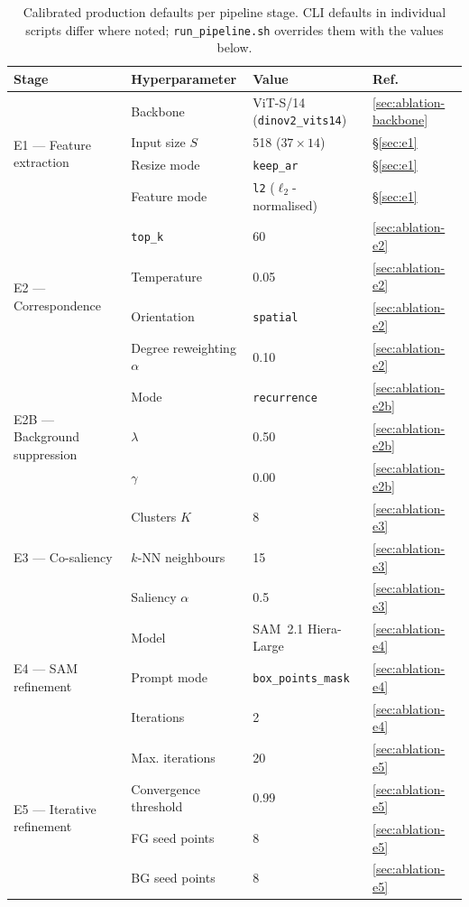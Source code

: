 \begin{table}[t]
\centering
\caption{Calibrated production defaults per pipeline stage. CLI defaults in individual scripts differ where noted; \texttt{run\_pipeline.sh} overrides them with the values below.}
\label{tab:production-defaults}
\begin{tabular}{@{}llll@{}}
\toprule
\textbf{Stage} & \textbf{Hyperparameter} & \textbf{Value} & \textbf{Ref.} \\
\midrule
\multirow{4}{*}{E1 --- Feature extraction}
  & Backbone            & ViT-S/14 (\texttt{dinov2\_vits14}) & \ref{sec:ablation-backbone} \\
  & Input size $S$      & 518 ($37\times14$)                 & \S\ref{sec:e1} \\
  & Resize mode         & \texttt{keep\_ar}                  & \S\ref{sec:e1} \\
  & Feature mode        & \texttt{l2} ($\ell_2$-normalised)  & \S\ref{sec:e1} \\
\midrule
\multirow{4}{*}{E2 --- Correspondence}
  & \texttt{top\_k}         & 60     & \ref{sec:ablation-e2} \\
  & Temperature          & 0.05   & \ref{sec:ablation-e2} \\
  & Orientation           & \texttt{spatial}   & \ref{sec:ablation-e2} \\
  & Degree reweighting $\alpha$ & 0.10 & \ref{sec:ablation-e2} \\
\midrule
\multirow{3}{*}{E2B --- Background suppression}
  & Mode                & \texttt{recurrence} & \ref{sec:ablation-e2b} \\
  & $\lambda$            & 0.50               & \ref{sec:ablation-e2b} \\
  & $\gamma$             & 0.00               & \ref{sec:ablation-e2b} \\
\midrule
\multirow{3}{*}{E3 --- Co-saliency}
  & Clusters $K$         & 8      & \ref{sec:ablation-e3} \\
  & $k$-NN neighbours    & 15     & \ref{sec:ablation-e3} \\
  & Saliency $\alpha$    & 0.5    & \ref{sec:ablation-e3} \\
\midrule
\multirow{3}{*}{E4 --- SAM refinement}
  & Model                & SAM~2.1 Hiera-Large & \ref{sec:ablation-e4} \\
  & Prompt mode          & \texttt{box\_points\_mask} & \ref{sec:ablation-e4} \\
  & Iterations           & 2      & \ref{sec:ablation-e4} \\
\midrule
\multirow{4}{*}{E5 --- Iterative refinement}
  & Max. iterations      & 20     & \ref{sec:ablation-e5} \\
  & Convergence threshold & 0.99  & \ref{sec:ablation-e5} \\
  & FG seed points       & 8      & \ref{sec:ablation-e5} \\
  & BG seed points       & 8      & \ref{sec:ablation-e5} \\
\bottomrule
\end{tabular}
\end{table}